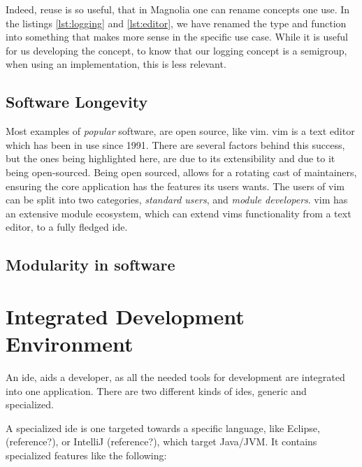 Indeed, reuse is so useful, that in Magnolia one can rename concepts one use.
In the listings \ref{lst:logging} and \ref{lst:editor}, we have renamed the type
and function into something that makes more sense in the specific use case.
While it is useful for us developing the concept, to know that our logging
concept is a semigroup, when using an implementation, this is less relevant.

\subsection{Software Longevity}

Most examples of \textit{popular} software, are open source, like \gls{vim}.
\gls{vim} is a text editor which has been in use since 1991. There are several
factors behind this success, but the ones being highlighted here, are due to its
extensibility and due to it being open-sourced. Being open sourced, allows for a
rotating cast of maintainers, ensuring the core application has the features its
users wants. The users of \gls{vim} can be split into two categories,
\textit{standard users}, and \textit{module developers}. \gls{vim} has an
extensive module ecosystem, which can extend \gls{vim}s functionality from a
text editor, to a fully fledged \gls{ide}.

\subsection{Modularity in software}


\section{Integrated Development Environment} \label{sec:ide}

An \gls{ide}, aids a developer, as all the needed tools for development are
integrated into one application. There are two different kinds of \gls{ide}s,
generic and specialized. 

A specialized \gls{ide} is one targeted towards a specific language, like
Eclipse, (reference?), or IntelliJ (reference?), which target Java/JVM. It
contains specialized features like the following:

